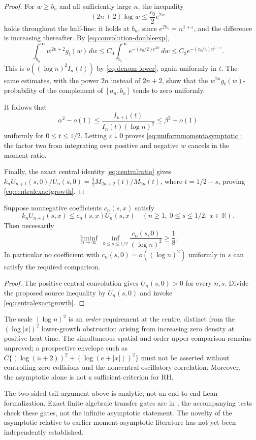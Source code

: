 \begin{proof}
For $w\ge b_n$ and all sufficiently large $n$,
the inequality
\[
(2n+2)\log w\le \frac{c_0}{2}e^{2w}
\]
holds throughout the half-line: it holds at
$b_n$, since $e^{2b_n}=n^{1+\varepsilon}$,
and the difference is increasing thereafter.
By \eqref{eq:convolution-doubleexp},
\[
\int_{b_n}^\infty w^{2n+2}g_t(w)\,dw
\le C_0\int_{b_n}^\infty
e^{-(c_0/2)e^{2w}}\,dw
\le C_2 e^{-(c_0/4)n^{1+\varepsilon}}.
\]
This is $o((\log n)^2 I_n(t))$
by \eqref{eq:denom-lower}, again uniformly
in $t$. The same estimates, with the power
$2n$ instead of $2n+2$, show that the
$w^{2n}g_t(w)$-probability of the complement
of $[a_n,b_n]$ tends to zero uniformly.

It follows that
\[
\alpha^2-o(1)\le
\frac{I_{n+1}(t)}{I_n(t)(\log n)^2}
\le\beta^2+o(1)
\]
uniformly for $0\le t\le1/2$.
Letting $\varepsilon\downarrow0$ proves
\eqref{eq:uniformmomentasymptotic};
the factor two from integrating over
positive and negative $w$ cancels in
the moment ratio.

Finally, the exact central identity
\eqref{eq:centralratio} gives
$k_nU_{n+1}(s,0)/U_n(s,0)
=\frac12M_{2n+2}(t)/M_{2n}(t)$,
where $t=1/2-s$, proving
\eqref{eq:centralexactgrowth}.
\end{proof}

\begin{corollary}\label{cor:necessary-order}
Suppose nonnegative coefficients $c_n(s,x)$
satisfy
\[
k_nU_{n+1}(s,x)\le c_n(s,x)U_n(s,x)
\quad
(n\ge1,\ 0\le s\le1/2,\ x\in\mathbb R).
\]
Then necessarily
\begin{equation}\label{eq:necessarycn}
\liminf_{n\to\infty}\ 
\inf_{0\le s\le1/2}
\frac{c_n(s,0)}{(\log n)^2}\ge\frac18.
\end{equation}
In particular no coefficient with
$c_n(s,0)=o((\log n)^2)$ uniformly
in $s$ can satisfy the required comparison.
\end{corollary}
\begin{proof}
The positive central convolution
gives $U_n(s,0)>0$ for every $n,s$.
Divide the proposed source inequality
by $U_n(s,0)$ and invoke
\eqref{eq:centralexactgrowth}.
\end{proof}

The scale $(\log n)^2$ is an \emph{order}
requirement at the centre, distinct from
the $(\log|x|)^2$ lower-growth
obstruction arising from increasing zero
density at positive heat time.
The simultaneous spatial-and-order
upper comparison remains unproved;
a prospective envelope such as
$C\{(\log(n+2))^2+(\log(e+|x|))^2\}$
must not be asserted without controlling
zero collisions and the noncentral
oscillatory correlation.
Moreover, the asymptotic alone is not a
sufficient criterion for RH.

The two-sided tail argument above is analytic,
not an end-to-end Lean formalization.
Exact finite algebraic transfer gates are in
;
the accompanying tests check these gates,
not the infinite asymptotic statement.
The novelty of the asymptotic relative to
earlier moment-asymptotic literature has
not yet been independently established.
